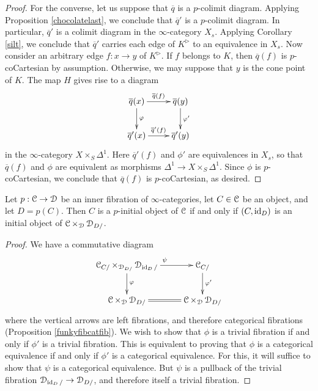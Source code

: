 \begin{proof}
For the converse, let us suppose that $\overline{q}$ is a $p$-colimit diagram.
Applying Proposition \ref{chocolatelast}, we conclude that $\overline{q}'$ is a $p$-colimit diagram. In particular, $\overline{q}'$ is a colimit diagram in the $\infty$-category
$X_{s}$. Applying Corollary \ref{silt}, we conclude that $\overline{q}'$ carries each
edge of $K^{\triangleright}$ to an equivalence in $X_{s}$. Now consider an arbitrary
edge $f: x \rightarrow y$ of $K^{\triangleright}$. If $f$ belongs to $K$, then
$\overline{q}(f)$ is $p$-coCartesian by assumption. Otherwise, we may suppose that
$y$ is the cone point of $K$. The map $H$ gives rise to a diagram
$$ \xymatrix{ \overline{q}(x) \ar[r]^{\overline{q}(f)} \ar[d]^{\phi} & \overline{q}(y) \ar[d]^{\phi'} \\
\overline{q}'(x) \ar[r]^{\overline{q}'(f)} & \overline{q}'(y) }$$
in the $\infty$-category $X \times_{S} \Delta^1$. Here 
$\overline{q}'(f)$ and $\phi'$ are equivalences in $X_{s}$, so that
$\overline{q}(f)$ and $\phi$ are equivalent as morphisms
$\Delta^1 \rightarrow X \times_{S} \Delta^1$. Since $\phi$ is $p$-coCartesian, we conclude
that $\overline{q}(f)$ is $p$-coCartesian, as desired.
\end{proof}

\begin{lemma}\label{gooodbar}
Let $p: \operatorname{\mathcal{C}} \rightarrow \operatorname{\mathcal{D}}$ be an inner fibration of $\infty$-categories, let
$C \in \operatorname{\mathcal{C}}$ be an object, and let $D = p(C)$.  Then $C$ is a $p$-initial object of $\operatorname{\mathcal{C}}$ if and only if $(C, \operatorname{id}_{D})$ is an initial object of $\operatorname{\mathcal{C}} \times_{ \operatorname{\mathcal{D}}} \operatorname{\mathcal{D}}_{D/}$.
\end{lemma}

\begin{proof}
We have a commutative diagram
$$ \xymatrix{ \calC_{C/} \times_{ \calD_{D/} } \calD_{ \id_{D}/} \ar[r]^{\psi} \ar[d]^{\phi} & \calC_{C/} \ar[d]^{\phi'} \\
\calC \times_{ \calD} \calD_{D/} \ar@{=}[r] & \calC \times_{\calD} \calD_{D/} }$$
where the vertical arrows are left fibrations, and therefore categorical fibrations (Proposition \ref{funkyfibcatfib}). We wish to show that $\phi$ is a trivial fibration if and only if $\phi'$ is a trivial fibration. This is equivalent to proving that $\phi$ is a categorical equivalence if and only if $\phi'$ is a categorical equivalence. For this, it will suffice to show that $\psi$ is a categorical equivalence.
But $\psi$ is a pullback of the trivial fibration $\operatorname{\mathcal{D}}_{\operatorname{id}_{D}/} \rightarrow \operatorname{\mathcal{D}}_{D/}$, and therefore itself a trivial fibration.
\end{proof}

